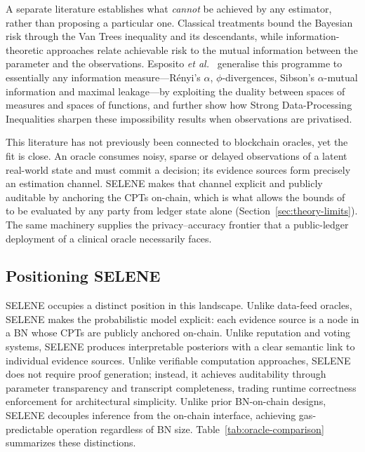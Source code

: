 \documentclass[journal]{IEEEtran}
\theoremstyle{definition}
\theoremstyle{remark}
\begin{document}
A separate literature establishes what \emph{cannot} be
achieved by any estimator, rather than proposing a
particular one. Classical treatments bound the Bayesian
risk through the Van Trees inequality and its
descendants, while information-theoretic approaches relate
achievable risk to the mutual information between the
parameter and the observations. Esposito \emph{et
al.}~\cite{esposito2024lower} generalise this programme to
essentially any information measure---R\'enyi's $\alpha$,
$\phi$-divergences, Sibson's $\alpha$-mutual information
and maximal leakage---by exploiting the duality between
spaces of measures and spaces of functions, and further
show how Strong Data-Processing Inequalities sharpen these
impossibility results when observations are privatised.

This literature has not previously been connected to
blockchain oracles, yet the fit is close. An oracle
consumes noisy, sparse or delayed observations of a latent
real-world state and must commit a decision; its evidence
sources form precisely an estimation channel. SELENE makes
that channel explicit and publicly auditable by anchoring
the CPTs on-chain, which is what allows the bounds
of~\cite{esposito2024lower} to be evaluated by any party
from ledger state alone
(Section~\ref{sec:theory-limits}). The same machinery
supplies the privacy--accuracy frontier that a public-ledger
deployment of a clinical oracle necessarily faces.

\subsection{Positioning SELENE}

SELENE occupies a distinct position in this landscape.
Unlike data-feed oracles, SELENE makes the probabilistic
model explicit: each evidence source is a node in a BN
whose CPTs are publicly anchored on-chain.
Unlike reputation and voting systems, SELENE produces
interpretable posteriors with a clear semantic link to
individual evidence sources.
Unlike verifiable computation approaches, SELENE does not
require proof generation; instead, it achieves
auditability through parameter transparency and
transcript completeness, trading runtime correctness
enforcement for architectural simplicity.
Unlike prior BN-on-chain designs, SELENE decouples
inference from the on-chain interface, achieving
gas-predictable operation regardless of BN size.
Table~\ref{tab:oracle-comparison} summarizes these
distinctions.
\end{document}
